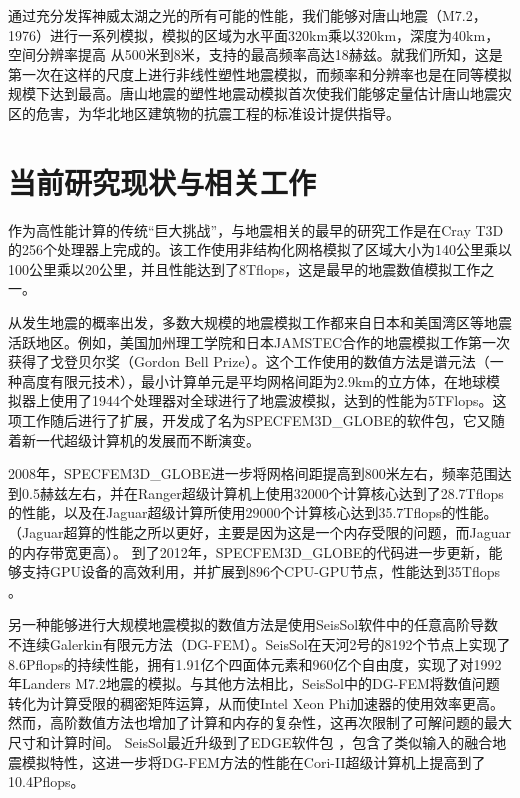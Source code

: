 \documentclass[degree=doctor]{thuthesis}
\begin{document}
通过充分发挥神威太湖之光的所有可能的性能，我们能够对唐山地震（M7.2，1976）进行一系列模拟，模拟的区域为水平面320km乘以320km，深度为40km，空间分辨率提高 从500米到8米，支持的最高频率高达18赫兹。就我们所知，这是第一次在这样的尺度上进行非线性塑性地震模拟，而频率和分辨率也是在同等模拟规模下达到最高。唐山地震的塑性地震动模拟首次使我们能够定量估计唐山地震灾区的危害，为华北地区建筑物的抗震工程的标准设计提供指导。

\section{当前研究现状与相关工作}

作为高性能计算的传统“巨大挑战”，与地震相关的最早的研究工作是在Cray T3D \citep {bao1996earthquake}的256个处理器上完成的。该工作使用非结构化网格模拟了区域大小为140公里乘以100公里乘以20公里，并且性能达到了8Tflops，这是最早的地震数值模拟工作之一。

从发生地震的概率出发，多数大规模的地震模拟工作都来自日本和美国湾区等地震活跃地区。例如，美国加州理工学院和日本JAMSTEC\citep {es-gb-2003}合作的地震模拟工作第一次获得了戈登贝尔奖（Gordon Bell Prize）。这个工作使用的数值方法是谱元法（一种高度有限元技术），最小计算单元是平均网格间距为2.9km的立方体，在地球模拟器上使用了1944个处理器对全球进行了地震波模拟，达到的性能为5TFlops。这项工作随后进行了扩展，开发成了名为SPECFEM3D\_GLOBE的软件包，它又随着新一代超级计算机的发展而不断演变。

2008年，SPECFEM3D\_GLOBE进一步将网格间距提高到800米左右，频率范围达到0.5赫兹左右，并在Ranger超级计算机上使用32000个计算核心达到了28.7Tflops的性能，以及在Jaguar超级计算所使用29000个计算核心达到35.7Tflops的性能。（Jaguar超算的性能之所以更好，主要是因为这是一个内存受限的问题，而Jaguar的内存带宽更高）。 到了2012年，SPECFEM3D\_GLOBE的代码进一步更新，能够支持GPU设备的高效利用，并扩展到896个CPU-GPU节点，性能达到35Tflops \citep {rietmann2012forward}。

另一种能够进行大规模地震模拟的数值方法是使用SeisSol软件中的任意高阶导数不连续Galerkin有限元方法（DG-FEM）。SeisSol在天河2号的8192个节点上实现了8.6Pflops的持续性能\citep{tianhe2-2014gb}，拥有1.91亿个四面体元素和960亿个自由度，实现了对1992年Landers M7.2地震的模拟。与其他方法相比，SeisSol中的DG-FEM将数值问题转化为计算受限的稠密矩阵运算，从而使Intel Xeon Phi加速器的使用效率更高。然而，高阶数值方法也增加了计算和内存的复杂性，这再次限制了可解问题的最大尺寸和计算时间。 SeisSol最近升级到了EDGE软件包 \citep {breuer2017edge}，包含了类似输入的融合地震模拟特性，这进一步将DG-FEM方法的性能在Cori-II超级计算机上提高到了10.4Pflops。
\end{document}
